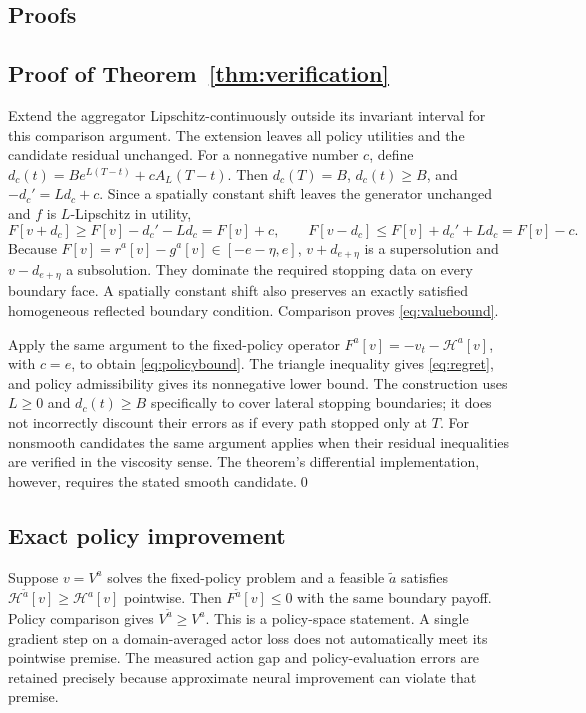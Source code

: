 \documentclass[ecta,draft]{econsocart}
\theoremstyle{definition}
\theoremstyle{remark}
\newcommand{\HH}{\mathcal H}
\begin{document}
\begin{appendix}
\section{Proofs}\label{app:proofs}
\subsection{Proof of Theorem~\ref{thm:verification}}
Extend the aggregator Lipschitz-continuously outside its invariant interval for this comparison argument. The extension leaves all policy utilities and the candidate residual unchanged. For a nonnegative number $c$, define $d_c(t)=Be^{L(T-t)}+cA_L(T-t)$. Then $d_c(T)=B$, $d_c(t)\geq B$, and $-d_c'=Ld_c+c$. Since a spatially constant shift leaves the generator unchanged and $f$ is $L$-Lipschitz in utility,
\[
 F[v+d_c]\geq F[v]-d_c'-Ld_c=F[v]+c,
 \qquad F[v-d_c]\leq F[v]+d_c'+Ld_c=F[v]-c.
\]
Because $F[v]=r^a[v]-g^a[v]\in[-e-\eta,e]$, $v+d_{e+\eta}$ is a supersolution and $v-d_{e+\eta}$ a subsolution. They dominate the required stopping data on every boundary face. A spatially constant shift also preserves an exactly satisfied homogeneous reflected boundary condition. Comparison proves \eqref{eq:valuebound}.

Apply the same argument to the fixed-policy operator $F^a[v]=-v_t-\HH^a[v]$, with $c=e$, to obtain \eqref{eq:policybound}. The triangle inequality gives \eqref{eq:regret}, and policy admissibility gives its nonnegative lower bound. The construction uses $L\geq0$ and $d_c(t)\geq B$ specifically to cover lateral stopping boundaries; it does not incorrectly discount their errors as if every path stopped only at $T$. For nonsmooth candidates the same argument applies when their residual inequalities are verified in the viscosity sense. The theorem's differential implementation, however, requires the stated smooth candidate.\qed

\subsection{Exact policy improvement}
Suppose $v=V^a$ solves the fixed-policy problem and a feasible $\tilde a$ satisfies $\HH^{\tilde a}[v]\geq\HH^a[v]$ pointwise. Then $F^{\tilde a}[v]\leq0$ with the same boundary payoff. Policy comparison gives $V^{\tilde a}\geq V^a$. This is a policy-space statement. A single gradient step on a domain-averaged actor loss does not automatically meet its pointwise premise. The measured action gap and policy-evaluation errors are retained precisely because approximate neural improvement can violate that premise.


\end{appendix}
\end{document}
